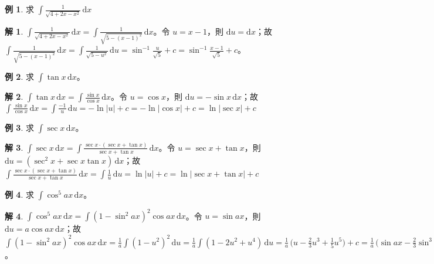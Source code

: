 \documentclass[12pt]{extarticle}
\newcommand{\ds}{\displaystyle}
\theoremstyle{definition}
\newtheorem*{ex}{例}
\newtheorem*{sol}{解}
\begin{document}
\begin{ex}
  求 $\ds\int\frac{1}{\sqrt{4 + 2x - x^2}}\,\mathrm{d}x$
\end{ex}
    
\begin{sol}
  $\ds\int\frac{1}{\sqrt{4 + 2x - x^2}}\,\mathrm{d}x = \int\frac{1}{\sqrt{5 - (x - 1)^2}}\,\mathrm{d}x$。令 $u = x - 1$，則 $\ds\mathrm{d}u = \mathrm{d}x$；故 $\ds\int\frac{1}{\sqrt{5 - (x - 1)^2}}\,\mathrm{d}x = \int\frac{1}{\sqrt{5 - u^2}}\,\mathrm{d}u = \sin^{-1}\frac{u}{\sqrt{5}} + c = \sin^{-1}\frac{x - 1}{\sqrt{5}} + c$。
\end{sol}

\begin{ex}
  求 $\ds\int\tan x\,\mathrm{d}x$。
\end{ex}

\begin{sol}
  $\ds\int\tan x\,\mathrm{d}x = \int\frac{\sin x}{\cos x}\,\mathrm{d}x$。令 $u = \cos x$，則 $\mathrm{d}u = -\sin x\,\mathrm{d}x$；故 $\ds\int\frac{\sin x}{\cos x}\,\mathrm{d}x = \int\frac{-1}{u}\,\mathrm{d}u = -\ln|u| + c = -\ln|\cos x| + c = \ln|\sec x| + c$
\end{sol}

\begin{ex}
  求 $\ds\int\sec x\,\mathrm{d}x$。
\end{ex}

\begin{sol}
  $\ds\int\sec x\,\mathrm{d}x = \int\frac{\sec x\cdot(\sec x + \tan x)}{\sec x + \tan x}\,\mathrm{d}x$。令 $u = \sec x + \tan x$，則 $\ds\mathrm{d}u = (\sec^2 x + \sec x\tan x)\,\mathrm{d}x$；故 $\ds\int\frac{\sec x\cdot(\sec x + \tan x)}{\sec x + \tan x}\,\mathrm{d}x = \int\frac{1}{u}\,\mathrm{d}u = \ln|u| + c = \ln|\sec x + \tan x| + c$
\end{sol}

\begin{ex}
  求 $\ds\int\cos^5 ax\,\mathrm{d}x$。 
\end{ex}

\begin{sol}
  $\ds\int\cos^5 ax\,\mathrm{d}x = \int(1-\sin^2 ax)^2\cos ax\,\mathrm{d}x$。令 $\ds u = \sin ax$，則 $\ds\mathrm{d}u = a\cos ax\,\mathrm{d}x$；故 $\ds\int(1-\sin^2 ax)^2\cos ax\,\mathrm{d}x = \frac{1}{a}\int(1-u^2)^2\,\mathrm{d}u = \frac{1}{a}\int(1 - 2u^2 + u^4)\,\mathrm{d}u = \frac{1}{a}\,\Big(u - \frac{2}{3}u^3 + \frac{1}{5}u^5\Big) + c = \frac{1}{a}\,\Big(\sin ax - \frac{2}{3}\sin^3 ax + \frac{1}{5}\sin^5 ax\Big) + c$。
\end{sol}
\end{document}
